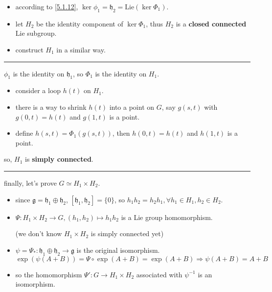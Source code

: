 \begin{itemize}
\begin{tcolorbox}[title=proof:]
\begin{itemize}
			\item according to \eqref{5.1.12}, $\ker{\phi_1} = \mathfrak{h}_2 = \mathrm{Lie}(\ker \Phi_1)$.
			
			\item let $H_2$ be the identity component of $\ker \Phi_1$, thus $H_2$ is a \textbf{closed connected} Lie subgroup.
			
			\item construct $H_1$ in a similar way.
		\end{itemize}
		
		\noindent\rule[0.5ex]{\linewidth}{0.5pt} %
		
		$\phi_1$ is the identity on $\mathfrak{h}_1$, so $\Phi_1$ is the identity on $H_1$.
		\begin{itemize}
			\item consider a loop $h(t)$ on $H_1$.
			
			\item there is a way to shrink $h(t)$ into a point on $G$, say $g(s, t)$ with $g(0, t) = h(t)$ and $g(1, t)$ is a point.
			
			\item define $h(s, t) = \Phi_1(g(s, t))$, then $h(0, t) = h(t)$ and $h(1, t)$ is a point.
		\end{itemize}
		so, $H_1$ is \textbf{simply connected}.
		
		\noindent\rule[0.5ex]{\linewidth}{0.5pt} %
		
		finally, let's prove $G \simeq H_1 \times H_2$.
		\begin{itemize}
			\item since $\mathfrak{g} = \mathfrak{h}_1 \oplus \mathfrak{h}_2$, $[\mathfrak{h}_1, \mathfrak{h}_2] = \{0\}$, so $h_1 h_2 = h_2 h_1, \forall h_1 \in H_1, h_2 \in H_2$.
			
			\item $\Psi : H_1 \times H_2 \rightarrow G, (h_1, h_2) \mapsto h_1 h_2$ is a Lie group homomorphism.
			
			(we don't know $H_1 \times H_2$ is simply connected yet)
			
			\item $\psi = \Psi_* : \mathfrak{h}_1 \oplus \mathfrak{h}_2 \rightarrow \mathfrak{g}$ is the original isomorphism.
			\begin{equation}
				\exp(\psi(A + B)) = \Psi \circ \exp(A + B) = \exp(A + B) \Longrightarrow \psi(A + B) = A + B
			\end{equation}
			
			\item so the homomorphism $\Psi' : G \rightarrow H_1 \times H_2$ associated with $\psi^{- 1}$ is an isomorphism.
		\end{itemize}
	\end{tcolorbox}
\end{itemize}

